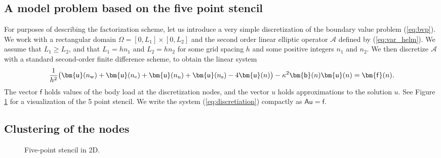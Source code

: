 \documentclass[11pt]{amsart}
\newcommand{\vct}[1]{\bm{\mathsf{#1}}}
\newcommand{\mtx}[1]{\bm{\mathsf{#1}}}
\begin{document}
\subsection{A model problem based on the five point stencil}
\label{sec:modeldisc}

For purposes of describing the factorization scheme, let us introduce a very
simple discretization of the boundary value problem (\ref{eq:bvp}).
We work 
with a rectangular domain $\Omega=[0,L_1] \times [0,L_2]$ and the second order
linear elliptic operator $\mathcal A$ defined by (\ref{eq:var_helm}). We assume 
that $L_1 \ge L_2$, and that $L_{1} = hn_{1}$ and $L_{2} = hn_{2}$ for some grid 
spacing $h$ and some positive integers $n_{1}$ and $n_{2}$.
We then
discretize $\mathcal{A}$ with a standard second-order finite difference scheme,
to obtain the linear system
\begin{equation}
\label{eq:discretiation}
\frac 1 {h^2} 
\bigl(
\vct{u}(n_{\rm w}) + 
\vct{u}(n_{\rm e}) +
\vct{u}(n_{\rm n}) +
\vct{u}(n_{\rm s}) -
4 \vct{u}(n)
\bigr)
- \kappa^2 \vct{b}(n)\vct{u}(n)
=
\vct{f}(n).
\end{equation}
The vector $\vct{f}$ holds values of the body load at the discretization nodes, and the vector $u$ holds approximations to the solution $u$. 
See Figure \ref{fig:fivept_stencil} for a visualization of the 5 point stencil. 
We write the system (\ref{eq:discretiation}) compactly as
$\mtx{A}\vct{u} = \vct{f}$.


\subsection{Clustering of the nodes}
\label{sec:clustering}

\begin{figure}
\vspace{0pt}
\centering

\newcommand{\stencilpt}[5][]{\node[smallpoint, #1, label={#5:#4}] at (#2) (#3) {};}


\caption{\centering Five-point \newline stencil in 2D.}


\label{fig:fivept_stencil}
\end{figure}
\end{document}
